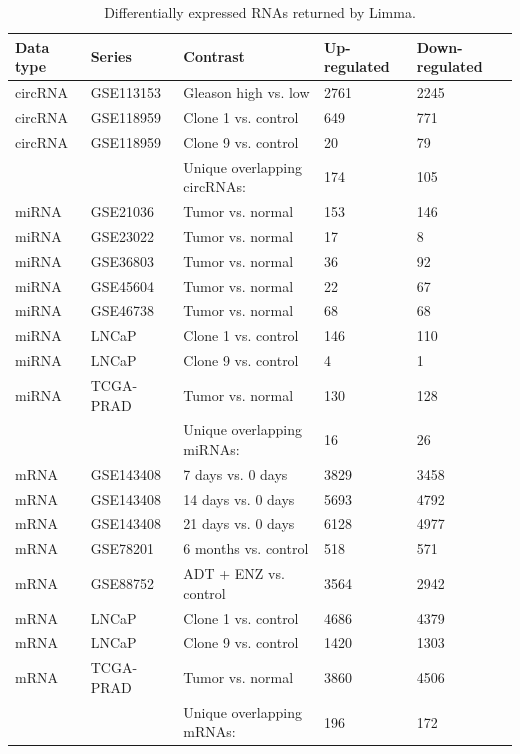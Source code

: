 \documentclass[twocolumn]{bmcart}%
\begin{document}
\begin{table}[ht!]
\caption{Differentially expressed RNAs returned by Limma.}
\begin{tabular}{lllll}
\toprule 
\textbf{Data type} & \textbf{Series} & \textbf{Contrast} & \textbf{Up-regulated} & \textbf{Down-regulated} 
\\
\toprule 
circRNA & GSE113153 & Gleason high vs. low & 2761 & 2245
\\
circRNA & GSE118959 & Clone 1 vs. control & 649 & 771 
\\ 
circRNA & GSE118959 & Clone 9 vs. control & 20 & 79 
\\ 
\toprule
& & Unique overlapping circRNAs: & 174 & 105
\\
\toprule
miRNA & GSE21036 & Tumor vs. normal & 153 & 146
\\ 
miRNA & GSE23022 & Tumor vs. normal & 17 & 8 
\\ 
miRNA & GSE36803 & Tumor vs. normal & 36 & 92
\\ 
miRNA & GSE45604 & Tumor vs. normal & 22 & 67 
\\
miRNA & GSE46738 & Tumor vs. normal & 68 & 68
\\
miRNA & LNCaP & Clone 1 vs. control & 146 & 110 
\\ 
miRNA & LNCaP & Clone 9 vs. control & 4 & 1
\\
miRNA & TCGA-PRAD & Tumor vs. normal & 130 & 128
\\
\toprule
& & Unique overlapping miRNAs: & 16 & 26
\\
\toprule 
mRNA & GSE143408 & 7 days vs. 0 days & 3829 & 3458
\\
mRNA & GSE143408 & 14 days vs. 0 days & 5693 & 4792
\\
mRNA & GSE143408 & 21 days vs. 0 days & 6128 & 4977
\\
mRNA & GSE78201 & 6 months vs. control & 518 & 571
\\
mRNA & GSE88752 & ADT + ENZ vs. control & 3564 & 2942
\\
mRNA & LNCaP & Clone 1 vs. control & 4686 & 4379 
\\
mRNA & LNCaP & Clone 9 vs. control & 1420 & 1303
\\
mRNA & TCGA-PRAD & Tumor vs. normal & 3860 & 4506 
\\
\toprule
& & Unique overlapping mRNAs: & 196 & 172 
\\
\toprule
\end{tabular}
\label{tab:de_results}
\end{table}
\end{document}

